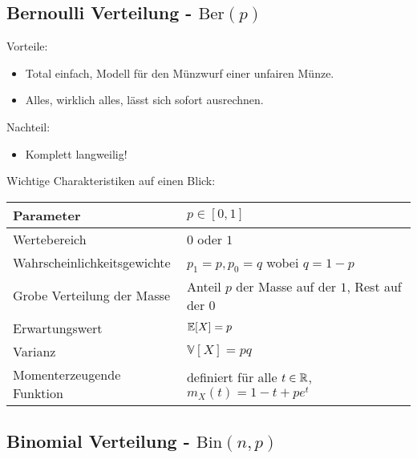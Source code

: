\documentclass[11pt, a4paper]{book}
\begin{document}
\subsection{Bernoulli Verteilung - $\text{Ber}(p)$}

{Vorteile:} 
\begin{itemize}
	\item Total einfach, Modell f\"ur den M\"unzwurf einer unfairen M\"unze.
	\item Alles, wirklich alles, l\"asst sich sofort ausrechnen.
\end{itemize}

{Nachteil:}
\begin{itemize}
	\item Komplett langweilig!
\end{itemize}

Wichtige Charakteristiken auf einen Blick:
\begin{center}
\begin{tabular}[h]{|l|l|}
\hline
Parameter& $p\in [0,1]$ \\
\hline
Wertebereich & $0$ oder $1$\\
\hline
Wahrscheinlichkeitsgewichte& $p_1=p, p_0=q$ wobei $q=1-p$\\
\hline
Grobe Verteilung der Masse & Anteil $p$ der Masse auf der $1$, Rest auf der $0$\\
\hline
Erwartungswert& $\mathbb{E}[X]=p$ \\
\hline
Varianz & $\mathbb V[X]=pq$\\
\hline
Momenterzeugende Funktion& definiert f\"ur alle $t\in \mathbb{R}$, $m_X(t)=1-t+pe^t$\\
\hline
\end{tabular}
\end{center}





\subsection{Binomial Verteilung - $\text{Bin}(n,p)$}
\end{document}
